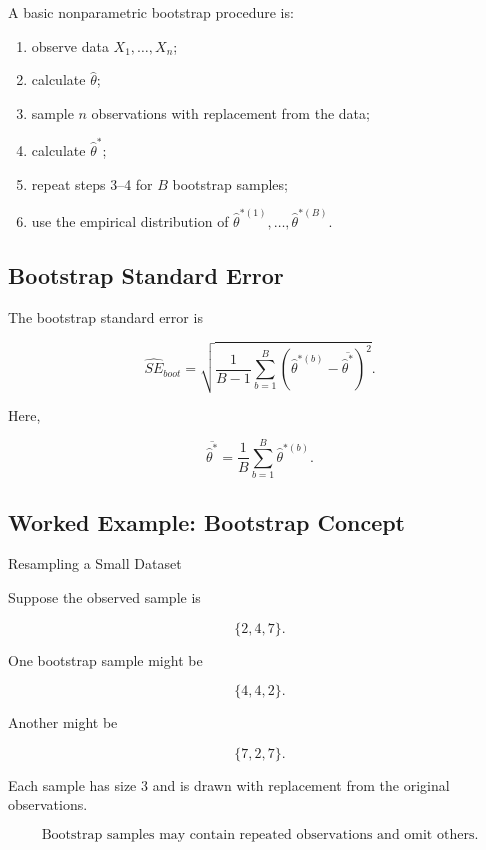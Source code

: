 A basic nonparametric bootstrap procedure is:

\begin{enumerate}
    \item observe data \(X_1,\ldots,X_n\);
    \item calculate \(\widehat{\theta}\);
    \item sample \(n\) observations with replacement from the data;
    \item calculate \(\widehat{\theta}^*\);
    \item repeat steps 3--4 for \(B\) bootstrap samples;
    \item use the empirical distribution of
          \(\widehat{\theta}^{*(1)},\ldots,\widehat{\theta}^{*(B)}\).
\end{enumerate}

\subsection{Bootstrap Standard Error}
\label{subsec:bootstrap-standard-error}

The bootstrap standard error is

\[
\boxed{
\widehat{SE}_{boot}
=
\sqrt{
\frac1{B-1}
\sum_{b=1}^{B}
\left(
\widehat{\theta}^{*(b)}
-
\overline{\widehat{\theta}^*}
\right)^2
}.
}
\]

Here,

\[
\boxed{
\overline{\widehat{\theta}^*}
=
\frac1B
\sum_{b=1}^{B}
\widehat{\theta}^{*(b)}.
}
\]

\subsection{Worked Example: Bootstrap Concept}
\label{subsec:worked-bootstrap-concept}

\begin{workedexamplebox}{Resampling a Small Dataset}

Suppose the observed sample is

\[
\{2,4,7\}.
\]

One bootstrap sample might be

\[
\{4,4,2\}.
\]

Another might be

\[
\{7,2,7\}.
\]

Each sample has size \(3\) and is drawn with replacement from the original
observations.

\begin{answerbox}
\[
\boxed{
\text{Bootstrap samples may contain repeated observations and omit
others.}
}
\]
\end{answerbox}

\end{workedexamplebox}

